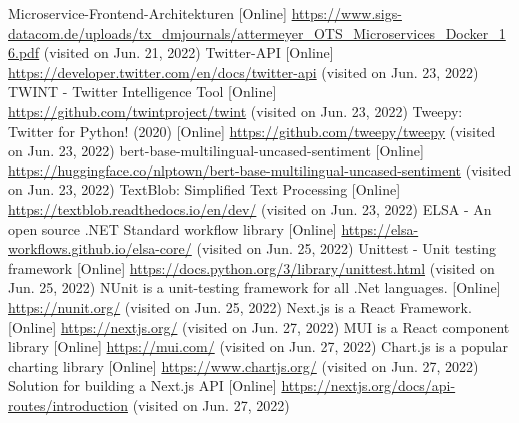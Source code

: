 \documentclass[conference]{IEEEtran}
\begin{document}
\begin{thebibliography}{0}
    Microservice-Frontend-Architekturen [Online] \url{https://www.sigs-datacom.de/uploads/tx_dmjournals/attermeyer_OTS_Microservices_Docker_16.pdf} (visited on Jun. 21, 2022)
    Twitter-API [Online] \url{https://developer.twitter.com/en/docs/twitter-api} (visited on Jun. 23, 2022)
    TWINT - Twitter Intelligence Tool [Online] \url{https://github.com/twintproject/twint} (visited on Jun. 23, 2022)
    Tweepy: Twitter for Python! (2020) [Online] \url{https://github.com/tweepy/tweepy} (visited on Jun. 23, 2022)
    bert-base-multilingual-uncased-sentiment [Online] \url{https://huggingface.co/nlptown/bert-base-multilingual-uncased-sentiment} (visited on Jun. 23, 2022)
    TextBlob: Simplified Text Processing [Online] \url{https://textblob.readthedocs.io/en/dev/} (visited on Jun. 23, 2022)
    ELSA - An open source .NET Standard workflow library [Online] \url{https://elsa-workflows.github.io/elsa-core/} (visited on Jun. 25, 2022)
    Unittest - Unit testing framework [Online] \url{https://docs.python.org/3/library/unittest.html} (visited on Jun. 25, 2022)
    NUnit is a unit-testing framework for all .Net languages. [Online] \url{https://nunit.org/} (visited on Jun. 25, 2022)
     Next.js is a React Framework. [Online] \url{https://nextjs.org/} (visited on Jun. 27, 2022)
     MUI is a React component library [Online] \url{https://mui.com/} (visited on Jun. 27, 2022)
     Chart.js is a popular charting library [Online] \url{https://www.chartjs.org/} (visited on Jun. 27, 2022)
     Solution for building a Next.js API [Online] \url{https://nextjs.org/docs/api-routes/introduction} (visited on Jun. 27, 2022)
\end{thebibliography}
\end{document}
